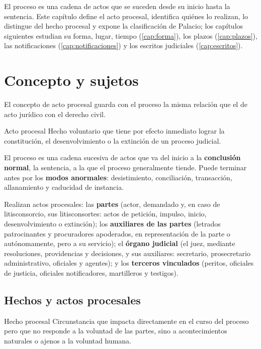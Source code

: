 \documentclass[12pt,oneside]{book}
\begin{document}
El proceso es una cadena de actos que se suceden desde su inicio hasta la sentencia. Este capítulo define el acto procesal, identifica quiénes lo realizan, lo distingue del hecho procesal y expone la clasificación de Palacio; los capítulos siguientes estudian su forma, lugar, tiempo (\ref{cap:forma}), los plazos (\ref{cap:plazos}), las notificaciones (\ref{cap:notificaciones}) y los escritos judiciales (\ref{cap:escritos}).

\section{Concepto y sujetos}

El concepto de acto procesal guarda con el proceso la misma relación que el de acto jurídico con el derecho civil.

\begin{definition}{Acto procesal}
Hecho voluntario que tiene por efecto inmediato lograr la constitución, el desenvolvimiento o la extinción de un proceso judicial.
\end{definition}

El proceso es una cadena sucesiva de actos que va del inicio a la \textbf{conclusión normal}, la sentencia, a la que el proceso generalmente tiende. Puede terminar antes por los \textbf{modos anormales}: desistimiento, conciliación, transacción, allanamiento y caducidad de instancia.

Realizan actos procesales: las \textbf{partes} (actor, demandado y, en caso de litisconsorcio, sus litisconsortes: actos de petición, impulso, inicio, desenvolvimiento o extinción); los \textbf{auxiliares de las partes} (letrados patrocinantes y procuradores apoderados, en representación de la parte o autónomamente, pero a su servicio); el \textbf{órgano judicial} (el juez, mediante resoluciones, providencias y decisiones, y sus auxiliares: secretario, prosecretario administrativo, oficiales y agentes); y los \textbf{terceros vinculados} (peritos, oficiales de justicia, oficiales notificadores, martilleros y testigos).

\subsection{Hechos y actos procesales}

\begin{definition}{Hecho procesal}
Circunstancia que impacta directamente en el curso del proceso pero que no responde a la voluntad de las partes, sino a acontecimientos naturales o ajenos a la voluntad humana.
\end{definition}
\end{document}
